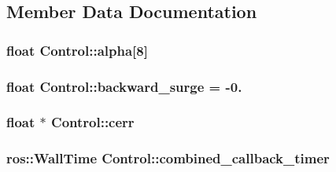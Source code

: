 \subsection{Member Data Documentation}
\subsubsection[{\texorpdfstring{alpha}{alpha}}]{\setlength{\rightskip}{0pt plus 5cm}float Control\+::alpha\mbox{[}8\mbox{]}\hspace{0.3cm}{\ttfamily [private]}}\hypertarget{classControl_a9d9f9a31c555e320a948d062f7435edf}{}\label{classControl_a9d9f9a31c555e320a948d062f7435edf}
\subsubsection[{\texorpdfstring{backward\+\_\+surge}{backward_surge}}]{\setlength{\rightskip}{0pt plus 5cm}float Control\+::backward\+\_\+surge = -\/0.\hspace{0.3cm}{\ttfamily [private]}}\hypertarget{classControl_a365181f0a2e284023f1bffcb91628f67}{}\label{classControl_a365181f0a2e284023f1bffcb91628f67}
\subsubsection[{\texorpdfstring{cerr}{cerr}}]{\setlength{\rightskip}{0pt plus 5cm}float $\ast$ Control\+::cerr\hspace{0.3cm}{\ttfamily [private]}}\hypertarget{classControl_a5b9e1402c27f26e5cc84d1e17a2d83b7}{}\label{classControl_a5b9e1402c27f26e5cc84d1e17a2d83b7}
\subsubsection[{\texorpdfstring{combined\+\_\+callback\+\_\+timer}{combined_callback_timer}}]{\setlength{\rightskip}{0pt plus 5cm}ros\+::\+Wall\+Time Control\+::combined\+\_\+callback\+\_\+timer\hspace{0.3cm}{\ttfamily [private]}}\hypertarget{classControl_a7a1dd562bded08231a44823a213afbee}{}\label{classControl_a7a1dd562bded08231a44823a213afbee}
